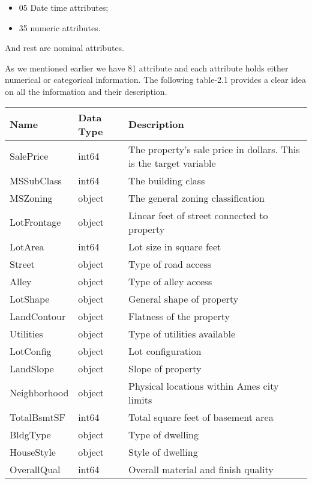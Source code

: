 \begin{itemize}
    \item 05 Date time attributes;
    \item 35 numeric attributes.
\end{itemize}
And rest are nominal attributes.

As we mentioned earlier we have 81 attribute and each attribute holds either numerical or categorical information. The following table-2.1 provides a clear idea on all the information and their description.

\begin{longtable}{|p{3cm}|p{3cm}|p{6.6cm}|}
\hline
\textbf{Name} & \textbf{Data Type} & \textbf{Description}                                             \\ \hline
SalePrice   & int64 & The property's sale price in dollars. This is the target variable \\ \hline
MSSubClass  & int64     & The building class \\ \hline
MSZoning    & object    & The general zoning classification \\ \hline
LotFrontage & object    & Linear feet of street connected to property \\ \hline
LotArea     & int64     & Lot size in square feet \\ \hline
Street      & object    & Type of road access \\ \hline
Alley       & object    & Type of alley access \\ \hline
LotShape    & object    & General shape of property \\ \hline
LandContour & object    & Flatness of the property \\ \hline
Utilities   & object    & Type of utilities available \\ \hline
LotConfig   & object    & Lot configuration \\ \hline
LandSlope   & object    & Slope of property \\ \hline
Neighborhood & object   & Physical locations within Ames city limits \\ \hline
TotalBsmtSF & int64     & Total square feet of basement area \\ \hline
BldgType    & object    & Type of dwelling \\ \hline
HouseStyle  & object    & Style of dwelling \\ \hline
OverallQual & int64     & Overall material and finish quality \\ \hline

\end{longtable}
